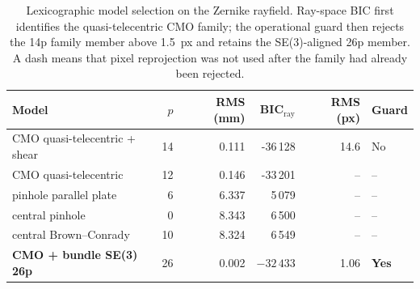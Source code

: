 \begin{table}[H]
\centering
\caption{Lexicographic model selection on the Zernike rayfield. Ray-space BIC first identifies the quasi-telecentric CMO family; the operational guard then rejects the 14p family member above 1.5~px and retains the SE(3)-aligned 26p member. A dash means that pixel reprojection was not used after the family had already been rejected.}
\label{tab:bic}
\begin{tabular}{lrrrrl}
\toprule
Model & $p$ & RMS (mm) & BIC$_{\text{ray}}$ & RMS (px) & Guard \\
\midrule
CMO quasi-telecentric + shear & 14 & 0.111 & -36\,128 & 14.6 & No \\
CMO quasi-telecentric & 12 & 0.146 & -33\,201 & -- & -- \\
pinhole parallel plate & 6 & 6.337 & 5\,079 & -- & -- \\
central pinhole & 0 & 8.343 & 6\,500 & -- & -- \\
central Brown--Conrady & 10 & 8.324 & 6\,549 & -- & -- \\
\textbf{CMO + bundle SE(3) 26p} & 26 & 0.002 & $-32\,433$ & 1.06 & \textbf{Yes} \\
\bottomrule
\end{tabular}
\end{table}
